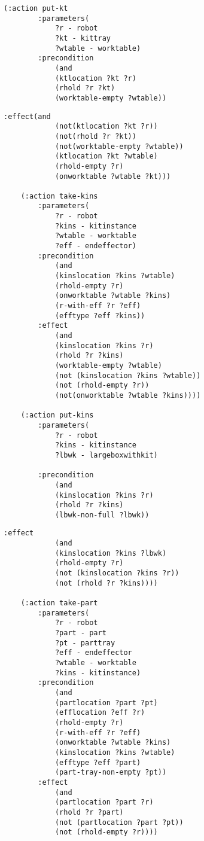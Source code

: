 \begin{appendices}
\begin{minipage}{.5\paperwidth}
\begin{mylisting}
\begin{Verbatim}[commandchars=\\\{\},commandchars=+\[\],fontsize=\small,numbersep=3pt]
	(:action put-kt
		:parameters(
			?r - robot
			?kt - kittray
			?wtable - worktable)
		:precondition
			(and
			(ktlocation ?kt ?r)
			(rhold ?r ?kt)
			(worktable-empty ?wtable))
\end{Verbatim}
\end{mylisting}
\end{minipage}

\begin{minipage}{.5\paperwidth}
\begin{mylisting}
\begin{Verbatim}[commandchars=\\\{\},commandchars=+\[\],fontsize=\small,numbersep=3pt]
		:effect(and
			(not(ktlocation ?kt ?r))
			(not(rhold ?r ?kt))
			(not(worktable-empty ?wtable))
			(ktlocation ?kt ?wtable)
			(rhold-empty ?r)
			(onworktable ?wtable ?kt)))

	(:action take-kins
		:parameters(
			?r - robot
			?kins - kitinstance
			?wtable - worktable
			?eff - endeffector)
		:precondition
			(and
			(kinslocation ?kins ?wtable)
			(rhold-empty ?r)
			(onworktable ?wtable ?kins)
			(r-with-eff ?r ?eff)
			(efftype ?eff ?kins))
		:effect
			(and
			(kinslocation ?kins ?r)
			(rhold ?r ?kins)
			(worktable-empty ?wtable)
			(not (kinslocation ?kins ?wtable))
			(not (rhold-empty ?r))
			(not(onworktable ?wtable ?kins))))
			
	(:action put-kins
		:parameters(
			?r - robot
			?kins - kitinstance
			?lbwk - largeboxwithkit)
		
		:precondition
			(and
			(kinslocation ?kins ?r)
			(rhold ?r ?kins)
			(lbwk-non-full ?lbwk))
\end{Verbatim}
\end{mylisting}
\end{minipage}

\begin{minipage}{.5\paperwidth}
\begin{mylisting}
\begin{Verbatim}[commandchars=\\\{\},commandchars=+\[\],fontsize=\small,numbersep=3pt]
		:effect
			(and
			(kinslocation ?kins ?lbwk)
			(rhold-empty ?r)
			(not (kinslocation ?kins ?r))
			(not (rhold ?r ?kins))))
			
	(:action take-part
		:parameters(
			?r - robot
			?part - part
			?pt - parttray
			?eff - endeffector
			?wtable - worktable
			?kins - kitinstance)
		:precondition
			(and
			(partlocation ?part ?pt)
			(efflocation ?eff ?r)
			(rhold-empty ?r)
			(r-with-eff ?r ?eff)
			(onworktable ?wtable ?kins)
			(kinslocation ?kins ?wtable)
			(efftype ?eff ?part)
			(part-tray-non-empty ?pt))
		:effect
			(and
			(partlocation ?part ?r)
			(rhold ?r ?part)
			(not (partlocation ?part ?pt))
			(not (rhold-empty ?r))))
			

\end{Verbatim}
\end{mylisting}
\end{minipage}
\end{appendices}
